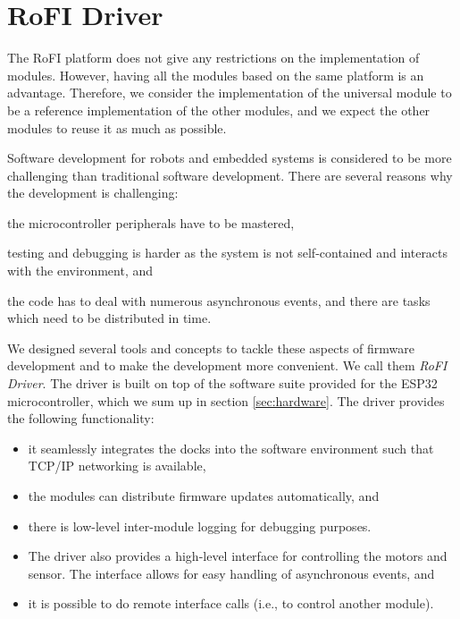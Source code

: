 \chapter{RoFI Driver}\label{chap:software}

The RoFI platform does not give any restrictions on the implementation of
modules. However, having all the modules based on the same platform is an
advantage. Therefore, we consider the implementation of the universal module to
be a reference implementation of the other modules, and we expect the other
modules to reuse it as much as possible.

Software development for robots and embedded systems is considered to be more
challenging than traditional software development. There are several reasons why
the development is challenging:
\begin{enumerate*}
    \item the microcontroller peripherals have to be mastered,
    \item testing and debugging is harder as the system is not self-contained
    and interacts with the environment, and
    \item the code has to deal with numerous asynchronous events, and there are
    tasks which need to be distributed in time.
\end{enumerate*}

We designed several tools and concepts to tackle these aspects of firmware
development and to make the development more convenient. We call them \emph{RoFI
Driver}. The driver is built on top of the software suite provided for the ESP32
microcontroller, which we sum up in section \ref{sec:hardware}. The driver
provides the following functionality:
\begin{itemize}
    \item it seamlessly integrates the docks into the software environment such
    that TCP/IP networking is available,
    \item the modules can distribute firmware updates automatically, and
    \item there is low-level inter-module logging for debugging purposes.
    \item The driver also provides a high-level interface for controlling the
    motors and sensor. The interface allows for easy handling of asynchronous
    events, and
    \item it is possible to do remote interface calls (i.e., to control another
    module).
\end{itemize}

